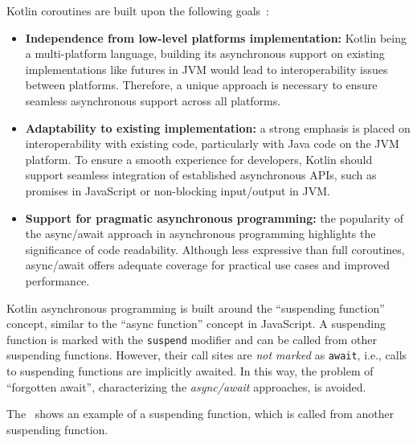 Kotlin coroutines are built upon the following goals~\cite{elizarov2021kotlin}:
\begin{itemize}
	\item \textbf{Independence from low-level platforms implementation:} Kotlin being a multi-platform language, building its asynchronous support on
	      existing implementations like futures in JVM would lead to interoperability issues between platforms. Therefore, a unique approach is
	      necessary to ensure seamless asynchronous support across all platforms.
	\item \textbf{Adaptability to existing implementation:} a strong emphasis is placed on interoperability with existing code, particularly with
	      Java code on the JVM platform. To ensure a smooth experience for developers, Kotlin should support seamless integration of established
	      asynchronous APIs, such as promises in JavaScript or non-blocking input/output in JVM.
	\item \textbf{Support for pragmatic asynchronous programming:} the popularity of the async/await approach in asynchronous programming highlights
	      the significance of code readability. Although less expressive than full coroutines, async/await offers adequate coverage for practical use
	      cases and improved performance.
\end{itemize}

Kotlin asynchronous programming is built around the ``suspending function'' concept, similar to the ``async function'' concept in JavaScript.
A suspending function is marked with the \texttt{suspend} modifier and can be called from other suspending functions. However, their call sites
are \emph{not marked} as \texttt{await}, i.e., calls to suspending functions are implicitly awaited.
In this way, the problem of ``forgotten await'', characterizing the \emph{async/await} approaches, is avoided.

The~ shows an example of a suspending function, which is called from another suspending function.



